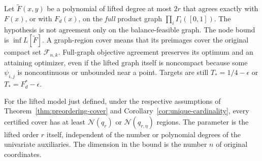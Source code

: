 Let $\widetilde F(x,y)$ be a polynomial of lifted degree at most $2r$
that agrees exactly with $F(x)$, or with $F_d(x)$, on the \emph{full}
product graph $\prod_i\Gamma_i([0,1])$. The hypothesis is not agreement only on the balance-feasible graph. The node bound is
$\inf L[\widetilde F]$. A graph-region cover means that its preimages
cover the original compact set $\mathcal F_{n,k}$. Full-graph objective
agreement preserves its optimum and an attaining optimizer, even if the
lifted graph itself is noncompact because some $\psi_{i,j}$ is
noncontinuous or unbounded near a point. Targets are still
$T_*=1/4-\epsilon$ or $T_*=F_d^*-\epsilon$.

\begin{theorem}
\label{thm:local-graph-lift}
For the lifted model just defined, under the respective assumptions of
Theorem~\ref{thm:preordering-cover} and
Corollary~\ref{cor:unique-cardinality}, every certified cover has at
least $\mathcal N(q_r)$ or $\mathcal N(q_{r,\eta})$ regions.
The parameter is the lifted order $r$ itself, independent of the number
or polynomial degrees of the univariate auxiliaries. The dimension in
the bound is the number $n$ of original coordinates.
\end{theorem}
